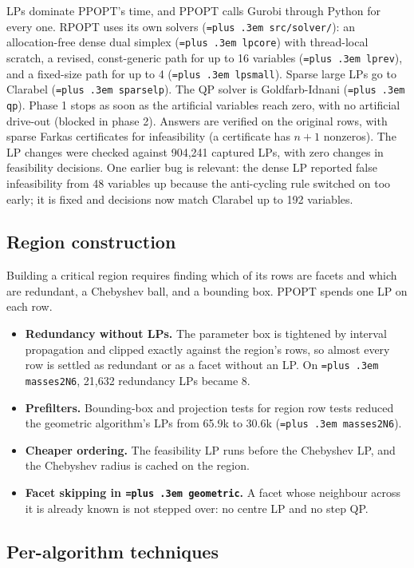 \documentclass[10pt,a4paper]{article}
\newcommand{\rpopt}{RPOPT}
\newcommand{\ppopt}{PPOPT}
\newcommand{\code}[1]{{\let\_\bu\texttt{\spaceskip=\fontdimen2\font plus .3em #1}}}
\newcommand{\bu}{\textunderscore\hspace{0pt}}
\begin{document}
LPs dominate \ppopt{}'s time, and \ppopt{} calls Gurobi through Python for every one. \rpopt{} uses its own solvers
(\code{src/solver/}): an allocation-free dense dual simplex (\code{lp\_core}) with thread-local scratch, a revised, const-generic
path for up to 16 variables (\code{lp\_rev}), and a fixed-size path for up to 4 (\code{lp\_small}). Sparse large LPs go to Clarabel
(\code{sparse\_lp}). The QP solver is Goldfarb-Idnani (\code{qp}). Phase 1 stops as soon as the artificial variables reach zero, with no
artificial drive-out (blocked in phase 2). Answers are verified on the original rows, with sparse Farkas certificates for
infeasibility (a certificate has $n+1$ nonzeros). The LP changes were checked against 904,241 captured LPs, with zero changes in
feasibility decisions. One earlier bug is relevant: the dense LP reported false infeasibility from 48 variables up because the
anti-cycling rule switched on too early; it is fixed and decisions now match Clarabel up to 192 variables.

\subsection{Region construction}

Building a critical region requires finding which of its rows are facets and which are redundant, a Chebyshev ball, and a
bounding box. \ppopt{} spends one LP on each row.
\begin{itemize}
  \item \textbf{Redundancy without LPs.} The parameter box is tightened by interval propagation and clipped exactly against the
    region's rows, so almost every row is settled as redundant or as a facet without an LP. On \code{masses2\_N6}, 21,632
    redundancy LPs became 8.
  \item \textbf{Prefilters.} Bounding-box and projection tests for region row tests reduced the geometric algorithm's LPs from
    65.9k to 30.6k (\code{masses2\_N6}).
  \item \textbf{Cheaper ordering.} The feasibility LP runs before the Chebyshev LP, and the Chebyshev radius is cached on the region.
  \item \textbf{Facet skipping in \code{geometric}.} A facet whose neighbour across it is already known is not stepped over: no
    centre LP and no step QP.
\end{itemize}

\subsection{Per-algorithm techniques}
\end{document}
